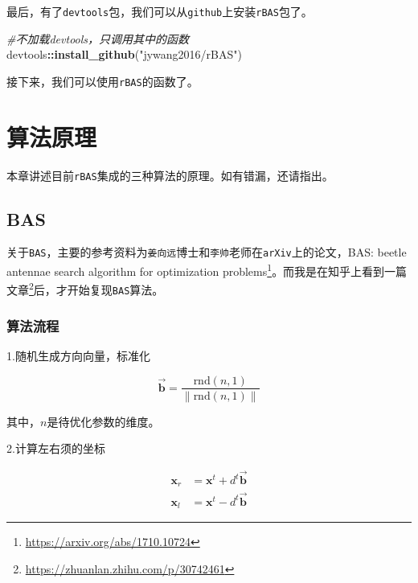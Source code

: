 \documentclass[]{ctexbook}
\newenvironment{Shaded}{\begin{snugshade}}{\end{snugshade}}
\newcommand{\KeywordTok}[1]{\textcolor[rgb]{0.13,0.29,0.53}{\textbf{#1}}}
\newcommand{\StringTok}[1]{\textcolor[rgb]{0.31,0.60,0.02}{#1}}
\newcommand{\CommentTok}[1]{\textcolor[rgb]{0.56,0.35,0.01}{\textit{#1}}}
\newcommand{\OperatorTok}[1]{\textcolor[rgb]{0.81,0.36,0.00}{\textbf{#1}}}
\newcommand{\NormalTok}[1]{#1}
\renewcommand{\href}[2]{#2\footnote{\url{#1}}}
\theoremstyle{definition}
\theoremstyle{definition}
\theoremstyle{definition}
\theoremstyle{remark}
\begin{document}
最后，有了\texttt{devtools}包，我们可以从\texttt{github}上安装\texttt{rBAS}包了。

\begin{Shaded}
\begin{Highlighting}[]
\CommentTok{#不加载devtools，只调用其中的函数}
\NormalTok{devtools}\OperatorTok{::}\KeywordTok{install_github}\NormalTok{(}\StringTok{"jywang2016/rBAS"}\NormalTok{)}
\end{Highlighting}
\end{Shaded}

接下来，我们可以使用\texttt{rBAS}的函数了。

\chapter{算法原理}\label{algorithm}

本章讲述目前\texttt{rBAS}集成的三种算法的原理。如有错漏，还请指出。

\section{BAS}\label{bas}

关于\texttt{BAS}，主要的参考资料为\texttt{姜向远}博士和\texttt{李帅}老师在\texttt{arXiv}上的论文，\href{https://arxiv.org/abs/1710.10724}{BAS:
beetle antennae search algorithm for optimization
problems}。而我是在知乎上看到一篇\href{https://zhuanlan.zhihu.com/p/30742461}{文章}后，才开始复现\texttt{BAS}算法。

\subsection{算法流程}\label{BASflow}

1.随机生成方向向量，标准化

\begin{equation}
\overrightarrow{\mathbf{b}}=\frac{\text{rnd}(n,1)}{\|\text{rnd}(n,1)\|}
\label{eq:dir}
\end{equation}

其中，\(n\)是待优化参数的维度。

2.计算左右须的坐标

\begin{equation}
\begin{split}
\mathbf{x}_r&=\mathbf{x}^t+d^t\overrightarrow{\mathbf{b}} \\
\mathbf{x}_l&=\mathbf{x}^t-d^t\overrightarrow{\mathbf{b}}
\end{split}
\label{eq:xlxr}
\end{equation}
\end{document}
